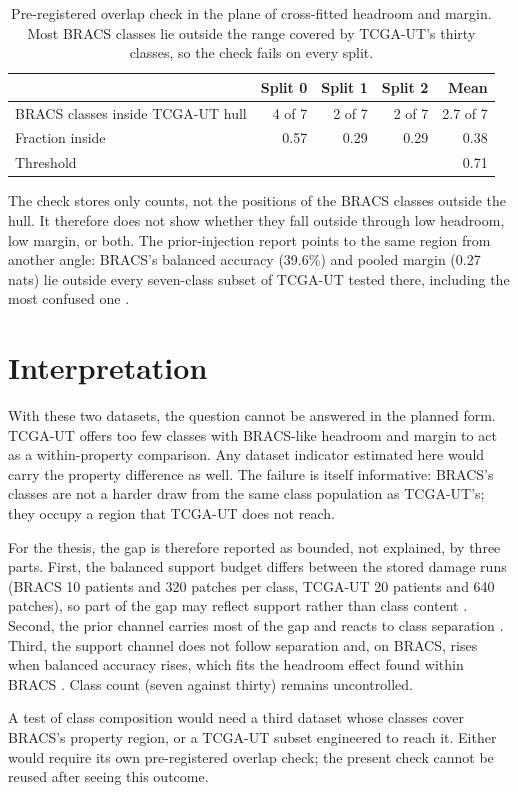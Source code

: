 \documentclass[11pt]{article}
\begin{document}
\begin{table}[ht]
  \centering
  \small
  \begin{tabular}{@{}lrrrr@{}}
    \toprule
    & Split 0 & Split 1 & Split 2 & Mean \\
    \midrule
    BRACS classes inside TCGA-UT hull & 4 of 7 & 2 of 7 & 2 of 7 & 2.7 of 7 \\
    Fraction inside                    & 0.57   & 0.29   & 0.29   & 0.38 \\
    \midrule
    Threshold                          &        &        &        & 0.71 \\
    \bottomrule
  \end{tabular}
  \caption{Pre-registered overlap check in the plane of cross-fitted headroom and margin. Most BRACS classes lie outside the range covered by TCGA-UT's thirty classes, so the check fails on every split.}
  \label{tab:gate}
\end{table}

\noindent The check stores only counts, not the positions of the BRACS classes outside the hull. It therefore does not show whether they fall outside through low headroom, low margin, or both. The prior-injection report points to the same region from another angle: BRACS's balanced accuracy (39.6\%) and pooled margin (0.27 nats) lie outside every seven-class subset of TCGA-UT tested there, including the most confused one \citep{queisler2026marginTcgaBracs}.

\section{Interpretation}
\label{sec:interpretation}
With these two datasets, the question cannot be answered in the planned form. TCGA-UT offers too few classes with BRACS-like headroom and margin to act as a within-property comparison. Any dataset indicator estimated here would carry the property difference as well. The failure is itself informative: BRACS's classes are not a harder draw from the same class population as TCGA-UT's; they occupy a region that TCGA-UT does not reach.

For the thesis, the gap is therefore reported as bounded, not explained, by three parts. First, the balanced support budget differs between the stored damage runs (BRACS 10 patients and 320 patches per class, TCGA-UT 20 patients and 640 patches), so part of the gap may reflect support rather than class content \citep{queisler2026prevalenceTcga, queisler2026prevalenceBracs}. Second, the prior channel carries most of the gap and reacts to class separation \citep{queisler2026separationTcgaBracs}. Third, the support channel does not follow separation and, on BRACS, rises when balanced accuracy rises, which fits the headroom effect found within BRACS \citep{queisler2026tailBracs}. Class count (seven against thirty) remains uncontrolled.

A test of class composition would need a third dataset whose classes cover BRACS's property region, or a TCGA-UT subset engineered to reach it. Either would require its own pre-registered overlap check; the present check cannot be reused after seeing this outcome.



\end{document}
